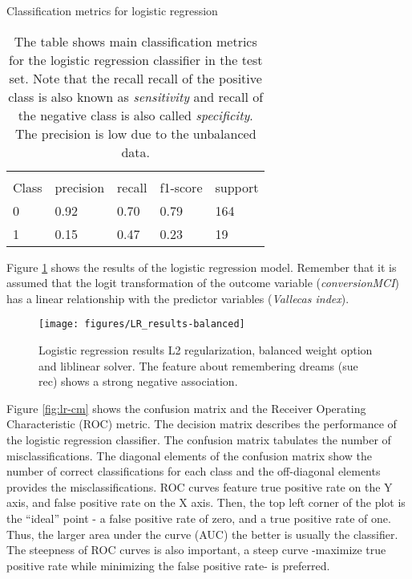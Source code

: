 \documentclass[11pt]{article}
\theoremstyle{definition}
\theoremstyle{remark}
\begin{document}
\begin{table}[H]
\caption{Classification metrics for logistic regression} \label{tab:logreg} 
\begin{center} 
\begin{tabular}{lllll}
\hline
\multicolumn{1}{c}{} \\
Class & precision & recall & f1-score & support     \\
\hline
0 & 0.92  &    0.70   &   0.79   &    164 \\
1 & 0.15  &    0.47   &   0.23   &     19 \\
\hline
\end{tabular}
\caption{The table shows  main classification metrics for the logistic regression classifier in the test set. Note that the recall recall of the positive class is also known as \emph{sensitivity} and recall of the negative class is also called \emph{specificity}. The precision is low due to the unbalanced data.}
\end{center}
\end{table}


Figure \ref{fig:logresres} shows the results of the logistic regression model. Remember that it is assumed that the logit transformation of the outcome variable (\emph{conversionMCI}) has a linear relationship with the predictor variables (\emph{Vallecas index}).

\begin{figure}[H]
        \centering
        \texttt{[image: figures/LR\_results-balanced]}
        \caption{Logistic regression results L2 regularization, balanced weight option and liblinear solver. The feature about remembering dreams (sue rec) shows a strong negative association.} \label{fig:logresres}
\end{figure}


Figure \ref{fig:lr-cm} shows the confusion matrix and the Receiver Operating Characteristic (ROC) metric. The decision matrix describes the performance of the logistic regression classifier. The confusion matrix tabulates the number of misclassifications. The diagonal elements of the confusion matrix show the number of correct classifications for each class and the off-diagonal elements provides the misclassifications. 
ROC curves feature true positive rate on the Y axis, and false positive rate on the X axis. Then, the top left corner of the plot is the “ideal” point - a false positive rate of zero, and a true positive rate of one. 
Thus, the larger area under the curve (AUC) the better is usually the classifier.
The steepness of ROC curves is also important, a steep curve -maximize true positive rate while minimizing the false positive rate- is preferred.
\end{document}
